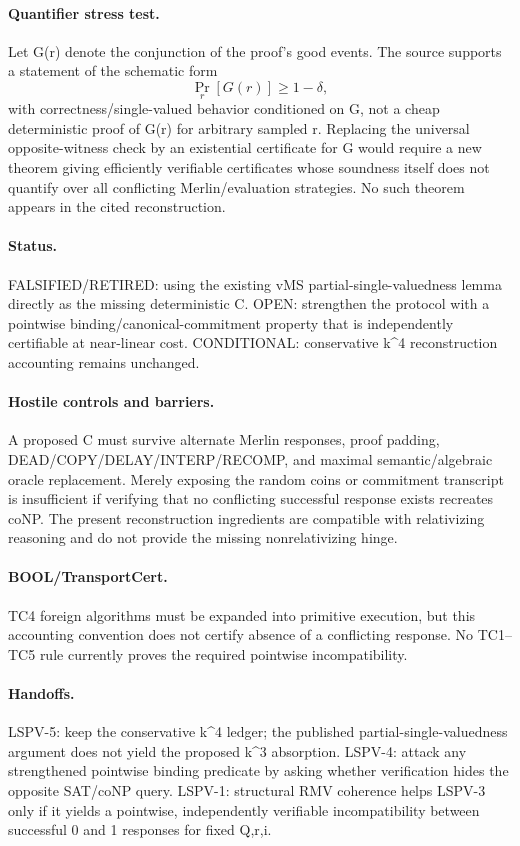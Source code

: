 \documentclass[11pt]{article}
\begin{document}
\paragraph{Quantifier stress test.}
Let G(r) denote the conjunction of the proof's good events. The source supports a statement of the schematic form
\[
\Pr_r[G(r)]\ge 1-\delta,
\]
with correctness/single-valued behavior conditioned on G, not a cheap deterministic proof of G(r) for arbitrary sampled r. Replacing the universal opposite-witness check by an existential certificate for G would require a new theorem giving efficiently verifiable certificates whose soundness itself does not quantify over all conflicting Merlin/evaluation strategies. No such theorem appears in the cited reconstruction.

\paragraph{Status.}
FALSIFIED/RETIRED: using the existing vMS partial-single-valuedness lemma directly as the missing deterministic C.
OPEN: strengthen the protocol with a pointwise binding/canonical-commitment property that is independently certifiable at near-linear cost.
CONDITIONAL: conservative k^4 reconstruction accounting remains unchanged.

\paragraph{Hostile controls and barriers.}
A proposed C must survive alternate Merlin responses, proof padding, DEAD/COPY/DELAY/INTERP/RECOMP, and maximal semantic/algebraic oracle replacement. Merely exposing the random coins or commitment transcript is insufficient if verifying that no conflicting successful response exists recreates coNP. The present reconstruction ingredients are compatible with relativizing reasoning and do not provide the missing nonrelativizing hinge.

\paragraph{BOOL/TransportCert.}
TC4 foreign algorithms must be expanded into primitive execution, but this accounting convention does not certify absence of a conflicting response. No TC1--TC5 rule currently proves the required pointwise incompatibility.

\paragraph{Handoffs.}
LSPV-5: keep the conservative k^4 ledger; the published partial-single-valuedness argument does not yield the proposed k^3 absorption.
LSPV-4: attack any strengthened pointwise binding predicate by asking whether verification hides the opposite SAT/coNP query.
LSPV-1: structural RMV coherence helps LSPV-3 only if it yields a pointwise, independently verifiable incompatibility between successful 0 and 1 responses for fixed Q,r,i.
\end{document}
